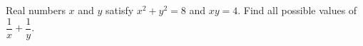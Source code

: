 Real numbers $x$ and $y$ satisfy $x^2+y^2=8$ and $xy=4$. Find all possible values of $\dfrac1x+\dfrac1y$.
